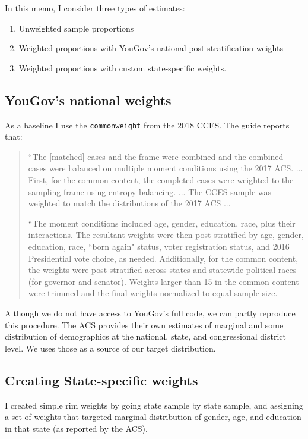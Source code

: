 \documentclass[11pt]{article}
\begin{document}
\noindent In this memo, I  consider three types of estimates:

\begin{enumerate}
\item Unweighted sample proportions
\item Weighted proportions with YouGov's national post-stratification weights
\item Weighted proportions with custom state-specific weights. 
\end{enumerate}

\subsection{YouGov's national weights} 

As a baseline I use the \texttt{commonweight} from the 2018 CCES. The guide reports that:

\begin{quote}
\singlespacing
``The [matched] cases and the frame were combined and the combined cases were balanced on multiple moment conditions using the 2017 ACS.  ... First, for the common content, the completed cases were weighted to the sampling frame using entropy balancing. ... The CCES sample was weighted to match the distributions of the 2017 ACS  ... 

``The moment conditions included age, gender, education, race, plus their interactions. The resultant weights were then post-stratified by age, gender, education, race, ``born again" status, voter registration status, and 2016 Presidential vote choice, as needed. Additionally, for the common content, the weights were post-stratified across states and statewide political races (for governor and senator). Weights larger than 15 in the common content were trimmed and the final weights normalized to equal sample size. 
\end{quote}

Although we do not have access to YouGov's full code, we can partly reproduce this procedure. The ACS provides their own estimates of marginal and some distribution of demographics at the national, state, and congressional district level. We uses those as a source of our target distribution.

\subsection{Creating State-specific weights} 

I created simple rim weights by going state sample by state sample, and assigning a set of weights that targeted marginal distribution of gender, age, and education in that state (as reported by the ACS). 
\end{document}
